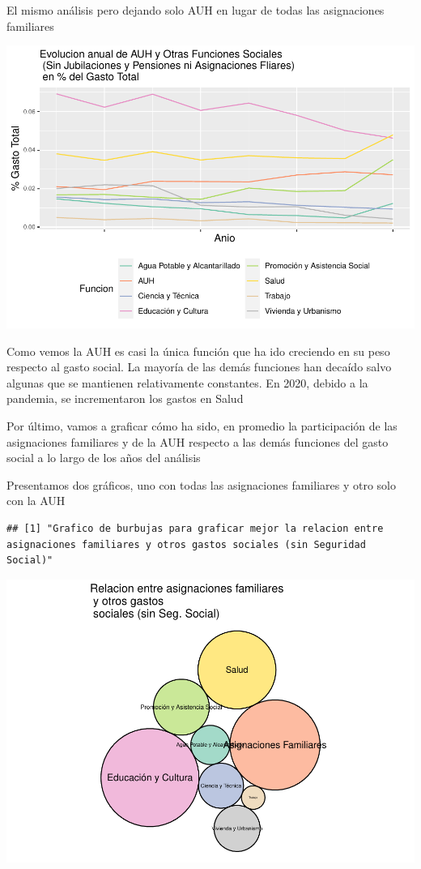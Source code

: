 \documentclass[
  12,
]{article}
\begin{document}
El mismo análisis pero dejando solo AUH en lugar de todas las
asignaciones familiares

\includegraphics{Grupo4_Final_files/figure-latex/graficos_presu_5-1.pdf}

Como vemos la AUH es casi la única función que ha ido creciendo en su
peso respecto al gasto social. La mayoría de las demás funciones han
decaído salvo algunas que se mantienen relativamente constantes. En
2020, debido a la pandemia, se incrementaron los gastos en Salud

Por último, vamos a graficar cómo ha sido, en promedio la participación
de las asignaciones familiares y de la AUH respecto a las demás
funciones del gasto social a lo largo de los años del análisis

Presentamos dos gráficos, uno con todas las asignaciones familiares y
otro solo con la AUH

\begin{verbatim}
## [1] "Grafico de burbujas para graficar mejor la relacion entre asignaciones familiares y otros gastos sociales (sin Seguridad Social)"
\end{verbatim}

\includegraphics{Grupo4_Final_files/figure-latex/graficos_presu_6-1.pdf}
\end{document}
